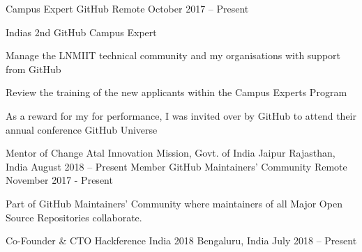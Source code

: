 \begin{cventries}
  \cventry
	{Campus Expert}
	{GitHub}
	{Remote}
	{October 2017 – Present}
	{\begin{cvitems}
		\item {India\textquotesingle{}s 2nd GitHub Campus Expert}
		\item {Manage the LNMIIT technical community and my organisations with support from GitHub}
		\item {Review the training of the new applicants within the Campus Experts Program}
		\item {As a reward for my for performance, I was invited over by GitHub to attend their annual conference GitHub Universe}
		\end{cvitems}}

  \cventry
	{Mentor of Change}
	{Atal Innovation Mission, Govt. of India}
	{Jaipur Rajasthan, India}
	{August 2018 – Present}
	{}
  \cventry
    {Member}
    {GitHub Maintainers' Community}
    {Remote}
    {November 2017 - Present}
    {\begin{cvitems}
        {Part of GitHub Maintainers' Community where maintainers of all Major Open Source Repositories collaborate.}
    \end{cvitems}}
  \cventry
	{Co-Founder \& CTO}
	{Hackference India 2018}
	{Bengaluru, India}
	{July 2018 – Present}
	{}
\end{cventries}
